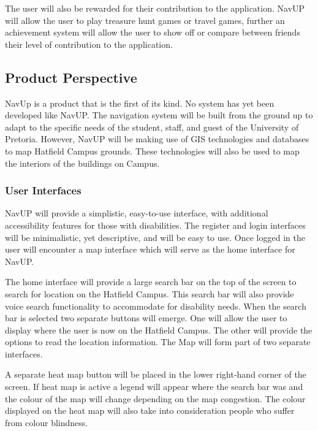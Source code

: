 \documentclass[12pt,a4paper]{article}
\begin{document}
The user will also be rewarded for their contribution to the application. NavUP will allow the user to play treasure hunt games or travel games, further an achievement system will allow the user to show off or compare between friends their level of contribution to the application.\newline
	\subsection{Product Perspective}
		NavUp is a product that is the first of its kind. No system has yet been developed like NavUP. The navigation system will be built from the ground up to adapt to the specific needs of the student, staff, and guest of the University of Pretoria. However, NavUP will be making use of GIS technologies and databases to map Hatfield Campus grounds. These technologies will also be used to map the interiors of the buildings on Campus.\newline
		\subsubsection{User Interfaces}
			NavUP will provide a simplistic, easy-to-use interface, with additional accessibility features for those with disabilities. The register and login interfaces will be minimalistic, yet descriptive, and will be easy to use. Once logged in the user will encounter a map interface which will serve as the home interface for NavUP.\newline

The home interface will provide a large search bar on the top of the screen to search for location on the Hatfield Campus. This search bar will also provide voice search functionality to accommodate for disability needs. When the search bar is selected two separate buttons will emerge. One will allow the user to display where the user is now on the Hatfield Campus. The other will provide the options to read the location information. The Map will form part of two separate interfaces.\newline

A separate heat map button will be placed in the lower right-hand corner of the screen. If heat map is active a legend will appear where the search bar was and the colour of the map will change depending on the map congestion. The colour displayed on the heat map will also take into consideration people who suffer from colour blindness.\newline
\end{document}
